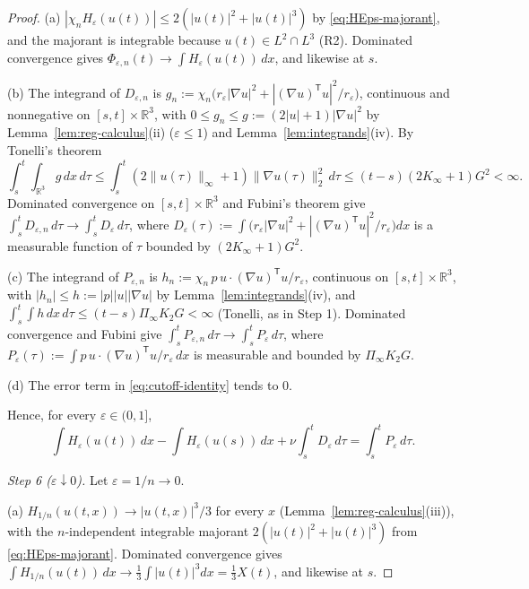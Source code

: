 \documentclass[11pt]{article}
\theoremstyle{definition}
\theoremstyle{plain}
\newcommand{\R}{\mathbb R}
\newcommand{\norm}[1]{\lVert #1\rVert}
\begin{document}
\begin{proof}
(a) $|\chi_nH_\varepsilon(u(t))|\leq2(|u(t)|^2+|u(t)|^3)$ by
\eqref{eq:HEps-majorant}, and the majorant is integrable because
$u(t)\in L^2\cap L^3$ (R2).  Dominated convergence gives
$\Phi_{\varepsilon,n}(t)\to\int H_\varepsilon(u(t))\,dx$, and likewise at $s$.

(b) The integrand of $D_{\varepsilon,n}$ is
$g_n:=\chi_n\bigl(r_\varepsilon|\nabla u|^2+|(\nabla u)^{\mathsf T}u|^2/r_\varepsilon\bigr)$,
continuous and nonnegative on $[s,t]\times\R^3$, with
$0\leq g_n\leq g:=(2|u|+1)|\nabla u|^2$ by Lemma~\ref{lem:reg-calculus}(ii)
($\varepsilon\leq1$) and Lemma~\ref{lem:integrands}(iv).  By Tonelli's
theorem \cite[Ch.~8]{Rudin1987}
\[
 \int_s^t\!\!\int_{\R^3}g\,dx\,d\tau
 \leq\int_s^t(2\norm{u(\tau)}_\infty+1)\norm{\nabla u(\tau)}_2^2\,d\tau
 \leq(t-s)(2K_\infty+1)G^2<\infty .
\]
Dominated convergence on $[s,t]\times\R^3$ and Fubini's theorem give
$\int_s^tD_{\varepsilon,n}\,d\tau\to\int_s^tD_\varepsilon\,d\tau$, where
$D_\varepsilon(\tau):=\int\bigl(r_\varepsilon|\nabla u|^2+|(\nabla u)^{\mathsf T}u|^2/r_\varepsilon\bigr)dx$
is a measurable function of $\tau$ bounded by $(2K_\infty+1)G^2$.

(c) The integrand of $P_{\varepsilon,n}$ is
$h_n:=\chi_n\,p\,u\cdot(\nabla u)^{\mathsf T}u/r_\varepsilon$, continuous on
$[s,t]\times\R^3$, with $|h_n|\leq h:=|p||u||\nabla u|$ by
Lemma~\ref{lem:integrands}(iv), and
$\int_s^t\!\int h\,dx\,d\tau\leq(t-s)\Pi_\infty K_2G<\infty$ (Tonelli, as in
Step 1).  Dominated convergence and Fubini give
$\int_s^tP_{\varepsilon,n}\,d\tau\to\int_s^tP_\varepsilon\,d\tau$, where
$P_\varepsilon(\tau):=\int p\,u\cdot(\nabla u)^{\mathsf T}u/r_\varepsilon\,dx$
is measurable and bounded by $\Pi_\infty K_2G$.

(d) The error term in \eqref{eq:cutoff-identity} tends to $0$.

Hence, for every $\varepsilon\in(0,1]$,
\begin{equation}\label{eq:eps-identity}
 \int H_\varepsilon(u(t))\,dx-\int H_\varepsilon(u(s))\,dx
 +\nu\int_s^tD_\varepsilon\,d\tau=\int_s^tP_\varepsilon\,d\tau .
\end{equation}

\emph{Step 6 ($\varepsilon\downarrow0$).}  Let $\varepsilon=1/n\to0$.

(a) $H_{1/n}(u(t,x))\to|u(t,x)|^3/3$ for every $x$
(Lemma~\ref{lem:reg-calculus}(iii)), with the $n$-independent integrable
majorant $2(|u(t)|^2+|u(t)|^3)$ from \eqref{eq:HEps-majorant}.  Dominated
convergence gives $\int H_{1/n}(u(t))\,dx\to\frac13\int|u(t)|^3dx=\frac13X(t)$,
and likewise at $s$.


\end{proof}
\end{document}
